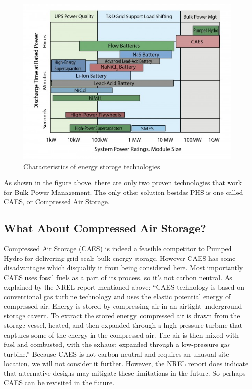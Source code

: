 \documentclass[hidelinks,12pt,a4paper]{article}
\begin{document}
\begin{figure}[ht!]
    \centering
    \includegraphics[width=.75\textwidth]{characteristics-of-energy-storage-technologies.jpg}
    \caption{Characteristics of energy storage technologies \cite{USGridEnergyStorageFactsheet}}
\end{figure}
\FloatBarrier

As shown in the figure above, there are only two proven technologies that work for Bulk Power Management. The only other solution besides PHS is one called CAES, or Compressed Air Storage.

\subsection{What About Compressed Air Storage?}
Compressed Air Storage (CAES) is indeed a feasible competitor to Pumped Hydro for delivering grid-scale bulk energy storage. However CAES has some disadvantages which disqualify it from being considered here. Most importantly CAES uses fossil fuels as a part of its process, so it's not carbon neutral. As explained by the NREL report mentioned above: “CAES technology is based on conventional gas turbine technology and uses the elastic potential energy of compressed air. Energy is stored by compressing air in an airtight underground storage cavern. To extract the stored energy, compressed air is drawn from the storage vessel, heated, and then expanded through a high-pressure turbine that captures some of the energy in the compressed air. The air is then mixed with fuel and combusted, with the exhaust expanded through a low-pressure gas turbine.” \cite{TheRoleOfEnergyStorageWithRenewableElectricityGeneration} Because CAES is not carbon neutral and requires an unusual site location, we will not consider it further. However, the NREL report does indicate that alternative designs may mitigate these limitations in the future. So perhaps CAES can be revisited in the future.
\end{document}
